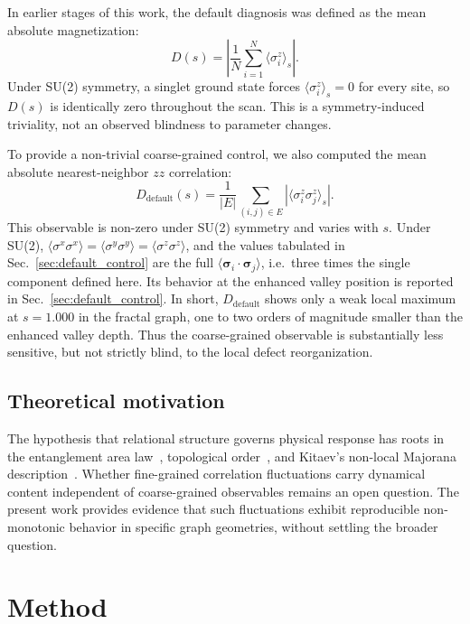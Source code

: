 \documentclass[aps,prb,reprint,superscriptaddress]{revtex4-2}
\begin{document}
In earlier stages of this work, the default diagnosis was defined as the mean absolute magnetization:
\begin{equation}
D(s)=\left|\frac{1}{N}\sum_{i=1}^N\langle\sigma_i^z\rangle_s\right|.
\end{equation}
Under SU(2) symmetry, a singlet ground state forces $\langle\sigma_i^z\rangle_s=0$ for every site, so $D(s)$ is identically zero throughout the scan. This is a symmetry-induced triviality, not an observed blindness to parameter changes.

To provide a non-trivial coarse-grained control, we also computed the mean absolute nearest-neighbor $zz$ correlation:
\begin{equation}
D_{\text{default}}(s)=\frac{1}{|E|}\sum_{(i,j)\in E}\left|\langle\sigma_i^z\sigma_j^z\rangle_s\right|.
\end{equation}
This observable is non-zero under SU(2) symmetry and varies with $s$. Under SU(2), $\langle\sigma^x\sigma^x\rangle=\langle\sigma^y\sigma^y\rangle=\langle\sigma^z\sigma^z\rangle$, and the values tabulated in Sec.~\ref{sec:default_control} are the full $\langle\boldsymbol{\sigma}_i\cdot\boldsymbol{\sigma}_j\rangle$, i.e.\ three times the single component defined here. Its behavior at the enhanced valley position is reported in Sec.~\ref{sec:default_control}. In short, $D_{\text{default}}$ shows only a weak local maximum at $s=1.000$ in the fractal graph, one to two orders of magnitude smaller than the enhanced valley depth. Thus the coarse-grained observable is substantially less sensitive, but not strictly blind, to the local defect reorganization.

\subsection{Theoretical motivation}

The hypothesis that relational structure governs physical response has roots in the entanglement area law~\cite{Eisert2010}, topological order~\cite{Wen2017}, and Kitaev's non-local Majorana description~\cite{Kitaev2001}. Whether fine-grained correlation fluctuations carry dynamical content independent of coarse-grained observables remains an open question. The present work provides evidence that such fluctuations exhibit reproducible non-monotonic behavior in specific graph geometries, without settling the broader question.

\section{Method}
\end{document}
